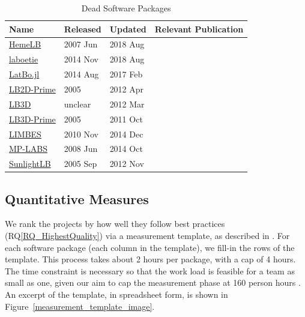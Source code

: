 \documentclass[final, 3p, times, authoryear]{elsarticle}
\newcommand{\rqref}[1]{RQ\ref{#1}}
\begin{document}
\begin{table}
	\begin{center}
		\begin{tabular}{ p{3cm}p{2cm}p{2cm}p{5.5cm} }
			\toprule
			Name & Released & Updated & Relevant Publication\\
			\midrule
			\href{https://github.com/UCL/hemelb}{HemeLB} & 2007 Jun & 2018 Aug&\citep{mazzeo2008hemelb}\\
			\href{https://github.com/maxlevesque/laboetie}{laboetie} & 2014 Nov & 2018 Aug&\citep{levesque2013accounting}\\		
			\href{https://github.com/UCL/LatBo.jl}{LatBo.jl} & 2014 Aug & 2017 Feb&\\
			\href{https://code.google.com/p/lb2d-prime-dev/source}{LB2D-Prime} & 2005 & 2012 Apr&\\
			\href{http://ccs.chem.ucl.ac.uk/sites/ccs.chem.ucl.ac.uk/themes/ccs2/files/lb3d-2012-03-12.tgz}{LB3D} & unclear & 2012 Mar&\citep{schmieschek2017lb3d}\\
			\href{https://code.google.com/archive/p/lb3d-prime-dev/source}{LB3D-Prime} & 2005 & 2011 Oct&\\
			\href{https://code.google.com/archive/p/limbes/source}{LIMBES} & 2010 Nov & 2014 Dec&\\
			\href{https://github.com/carlosrosales/mplabs}{MP-LABS} & 2008 Jun & 2014 Oct&\\
			\href{https://sourceforge.net/projects/sunlightlb/files/latest/download}{SunlightLB} & 2005 Sep & 2012 Nov&\\
			\bottomrule
		\end{tabular}
		\caption{Dead Software Packages} \label{deadpackages}
	\end{center}
\end{table}

\subsection{Quantitative Measures} \label{empiricalmeasures}

We rank the projects by how well they follow best practices
(\rqref{RQ_HighestQuality}) via a measurement template, as described in
\citet{SmithEtAl2021}.  For each software package (each column in the template),
we fill-in the rows of the template. This process takes about 2 hours per
package, with a cap of 4 hours. The time constraint is necessary so that the
work load is feasible for a team as small as one, given our aim to cap the
measurement phase at 160 person hours \citep{SmithEtAl2021}.  An excerpt of the
template, in spreadsheet form, is shown in
Figure~\ref{measurement_template_image}.
\end{document}
